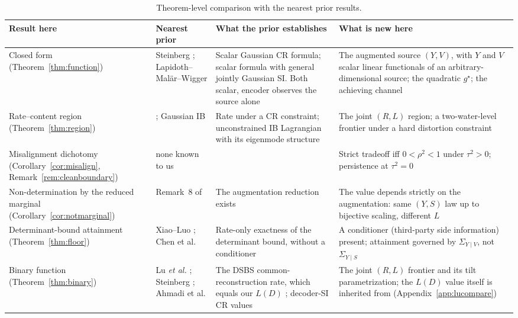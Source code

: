 ﻿\documentclass[11pt,onecolumn]{IEEEtran}
\begin{document}
\begin{table}[!t]
\caption{Theorem-level comparison with the nearest prior results.}
\label{tab:whatsnew}
\centering
\footnotesize
\begin{tabular}{p{1.35in}p{1.55in}p{1.55in}p{1.55in}}
\hline
Result here & Nearest prior & What the prior establishes & What is new
here\\
\hline
Closed form (Theorem~\ref{thm:function}) & Steinberg
\cite{steinberg2009}; Lapidoth--Mal\"ar--Wigger \cite{lapidoth2014} &
Scalar Gaussian CR formula; scalar formula with general jointly Gaussian
SI. Both scalar, encoder observes the source alone & The augmented source
$(Y,V)$, with $Y$ and $V$ scalar linear functionals of an
arbitrary-dimensional source; the quadratic $g^\star$; the achieving
channel\\
Rate--content region (Theorem~\ref{thm:region}) & \cite{steinberg2009,
lapidoth2014}; Gaussian IB \cite{chechik2005} & Rate under a CR
constraint; unconstrained IB Lagrangian with its eigenmode structure &
The joint $(R,L)$ region; a two-water-level frontier under a hard
distortion constraint\\
Misalignment dichotomy (Corollary~\ref{cor:misalign},
Remark~\ref{rem:cleanboundary}) & none known to us & & Strict tradeoff iff
$0<\rho^2<1$ under $\tau^2>0$; persistence at $\tau^2=0$\\
Non-determination by the reduced marginal
(Corollary~\ref{cor:notmarginal}) & Remark~8 of \cite{lapidoth2014} &
The augmentation reduction exists & The value depends strictly on the
augmentation: same $(Y,S)$ law up to bijective scaling, different $L$\\
Determinant-bound attainment (Theorem~\ref{thm:floor}) & Xiao--Luo
\cite{xiaoluo2005}; Chen et al. \cite{chen2026} & Rate-only exactness of
the determinant bound, without a conditioner & A conditioner (third-party side information) present;
attainment governed by $\Sigma_{Y\mid V}$, not $\Sigma_{Y\mid S}$\\
Binary function (Theorem~\ref{thm:binary}) & Lu \emph{et al.}
\cite{lu2016lossy,lu2016binary}; Steinberg \cite{steinberg2009}; Ahmadi et
al. \cite{ahmadi2013} & The DSBS common-reconstruction rate, which equals our
$L(D)$ \cite{lu2016lossy}; decoder-SI CR values \cite{steinberg2009,ahmadi2013}
& The joint $(R,L)$ frontier and its tilt parametrization; the $L(D)$ value
itself is inherited from \cite{lu2016lossy} (Appendix~\ref{app:lucompare})\\
\hline
\end{tabular}
\end{table}
\end{document}
